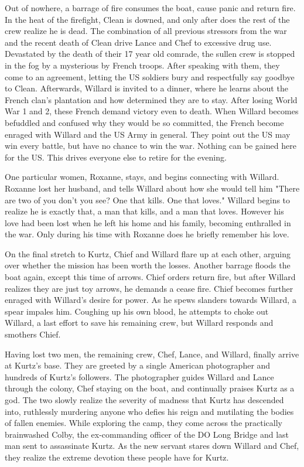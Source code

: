 \documentclass[a4paper,man,natbib]{apa6}
\begin{document}
Out of nowhere, a barrage of fire consumes the boat, cause panic and return fire. In the heat of the firefight, Clean is downed, and only after does the rest of the crew realize he is dead. 
The combination of all previous stressors from the war and the recent death of Clean drive Lance and Chef to excessive drug use. Devastated by the death of their 17 year old comrade, the sullen crew is stopped in the fog by a mysterious by French troops. After speaking with them, they come to an agreement, letting the US soldiers bury and respectfully say goodbye to Clean. Afterwards, Willard is invited to a dinner, where he learns about the French clan's plantation and how determined they are to stay. After losing World War 1 and 2, these French demand victory even to death. When Willard becomes befuddled and confused why they would be so committed, the French become enraged with Willard and the US Army in general. They point out the US may win every battle, but have no chance to win the war. Nothing can be gained here for the US. This drives everyone else to retire for the evening.

One particular women, Roxanne, stays, and begins connecting with Willard. Roxanne lost her husband, and tells Willard about how she would tell him "There are two of you don't you see? One that kills. One that loves." Willard begins to realize he is exactly that, a man that kills, and a man that loves. However his love had been lost when he left his home and his family, becoming enthralled in the war. Only during his time with Roxanne does he briefly remember his love.

On the final stretch to Kurtz, Chief and Willard flare up at each other, arguing over whether the mission has been worth the losses. Another barrage floods the boat again, except this time of arrows. Chief orders return fire, but after Willard realizes they are just toy arrows, he demands a cease fire. Chief becomes further enraged with Willard's desire for power. As he spews slanders towards Willard, a spear impales him. Coughing up his own blood, he attempts to choke out Willard, a last effort to save his remaining crew, but Willard responds and smothers Chief.

Having lost two men, the remaining crew, Chef, Lance, and Willard, finally arrive at Kurtz's base. They are greeted by a single American photographer and hundreds of Kurtz's followers. The photographer guides Willard and Lance through the colony, Chef staying on the boat, and continually praises Kurtz as a god. The two slowly realize the severity of madness that Kurtz has descended into, ruthlessly murdering anyone who defies his reign and mutilating the bodies of fallen enemies. While exploring the camp, they come across the practically brainwashed Colby, the ex-commanding officer of the DO Long Bridge and last man sent to assassinate Kurtz. As the new servant stares down Willard and Chef, they realize the extreme devotion these people have for Kurtz.
\end{document}

